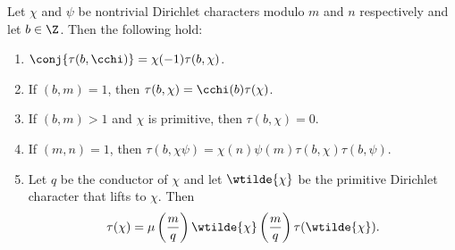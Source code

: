         \begin{proposition}\label{prop:Gauss_sum_reduction}
          Let $\chi$ and $\psi$ be nontrivial Dirichlet characters modulo $m$ and $n$ respectively and let $b \in \Z$. Then the following hold:
          \begin{enumerate}[label=(\roman*)]
            \item $\conj{\tau(b,\cchi)} = \chi(-1)\tau(b,\chi)$.
            \item If $(b,m) = 1$, then $\tau(b,\chi) = \cchi(b)\tau(\chi)$.
            \item If $(b,m) > 1$ and $\chi$ is primitive, then $\tau(b,\chi) = 0$.
            \item If $(m,n) = 1$, then $\tau(b,\chi\psi) = \chi(n)\psi(m)\tau(b,\chi)\tau(b,\psi)$.
            \item Let $q$ be the conductor of $\chi$ and let $\wtilde{\chi}$ be the primitive Dirichlet character that lifts to $\chi$. Then
            \[
              \tau(\chi) = \mu\left(\frac{m}{q}\right)\wtilde{\chi}\left(\frac{m}{q}\right)\tau(\wtilde{\chi}).
            \]
          \end{enumerate}
        \end{proposition}
